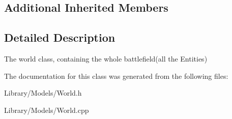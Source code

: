 \subsection*{Additional Inherited Members}


\subsection{Detailed Description}
The world class, containing the whole battlefield(all the Entities) 

The documentation for this class was generated from the following files\+:\begin{DoxyCompactItemize}
\item 
Library/\+Models/World.\+h\item 
Library/\+Models/World.\+cpp\end{DoxyCompactItemize}

